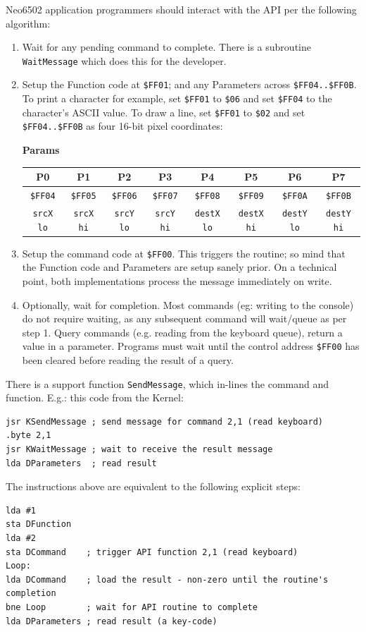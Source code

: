 \documentclass[12pt]{article}
\newcommand{\MonoSp}[1] {\fontsize{10pt}{10pt}\selectfont\texttt{#1}\normalsize}
\newcommand{\ParamsBytes}[9] {
  \fontsize{10pt}{10pt}\selectfont
  \textbf{#1}
  \newline
    \begin{tabular}{ | c | c | c | c | c | c | c | c | }                       \hline
      P0 & P1 & P2 & P3 & P4 & P5 & P6 & P7                                 \\
      \hline
      \MonoSp{\$FF04} & \MonoSp{\$FF05} & \MonoSp{\$FF06} & \MonoSp{\$FF07} &
      \MonoSp{\$FF08} & \MonoSp{\$FF09} & \MonoSp{\$FF0A} & \MonoSp{\$FF0B} \\ \hline
      \MonoSp{#2}     & \MonoSp{#3}     & \MonoSp{#4}     & \MonoSp{#5}     &
      \MonoSp{#6}     & \MonoSp{#7}     & \MonoSp{#8}     & \MonoSp{#9}     \\ \hline
    \end{tabular}
  \normalsize
  \newline
}
\begin{document}
Neo6502 application programmers should interact with the API
per the following algorithm:

\begin{enumerate}
  \item Wait for any pending command to complete.
        There is a subroutine \MonoSp{WaitMessage} which does this for the developer.
  \item Setup the Function code at \MonoSp{\$FF01};
        and any Parameters across \MonoSp{\$FF04..\$FF0B}.
        To print a character for example, set \MonoSp{\$FF01} to \MonoSp{\$06}
        and set \MonoSp{\$FF04} to the character's ASCII value.
        To draw a line, set \MonoSp{\$FF01} to \MonoSp{\$02}
        and set \MonoSp{\$FF04..\$FF0B} as four 16-bit pixel coordinates:

        \ParamsBytes{Params}{srcX lo}{srcX hi}{srcY lo}{srcY hi}{destX lo}{destX hi}{destY lo}{destY hi}
  \item Setup the command code at \MonoSp{\$FF00}. This triggers the routine;
        so mind that the Function code and Parameters are setup sanely prior.
        On a technical point, both implementations process the message immediately on write.
  \item Optionally, wait for completion.
        Most commands (eg: writing to the console) do not require waiting,
        as any subsequent command will wait/queue as per step 1.
        Query commands (e.g. reading from the keyboard queue),
        return a value in a parameter.
        Programs must wait until the control address \MonoSp{\$FF00} has been cleared
        before reading the result of a query.
\end{enumerate}

There is a support function \MonoSp{SendMessage},
which in-lines the command and function.
E.g.: this code from the Kernel:

\begin{verbatim}
jsr KSendMessage ; send message for command 2,1 (read keyboard)
.byte 2,1
jsr KWaitMessage ; wait to receive the result message
lda DParameters  ; read result
\end{verbatim}

The instructions above are equivalent to the following explicit steps:
\begin{verbatim}
lda #1
sta DFunction
lda #2
sta DCommand    ; trigger API function 2,1 (read keyboard)
Loop:
lda DCommand    ; load the result - non-zero until the routine's completion
bne Loop        ; wait for API routine to complete
lda DParameters ; read result (a key-code)
\end{verbatim}
\end{document}
